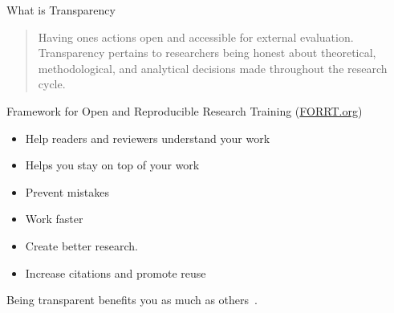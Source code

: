 
\begin{block}{What is Transparency}
   \begin{quote}
       Having one\textquotesingle s actions open and accessible for external evaluation. Transparency pertains to researchers being honest about theoretical, methodological, and analytical decisions made throughout the research cycle.
   \end{quote} 
   Framework for Open and Reproducible Research Training (\href{https://forrt.org/glossary/transparency/}{FORRT.org})  
  
  \begin{itemize}
  \item Help readers and reviewers understand your work
  \item Helps you stay on top of your work
  \item Prevent mistakes
  \item Work faster
  \item Create better research. 
  \item Increase citations and promote reuse
  \end{itemize}  
  Being transparent benefits you as much as others~\footnotemark[1]. 
  


      

\end{block}
